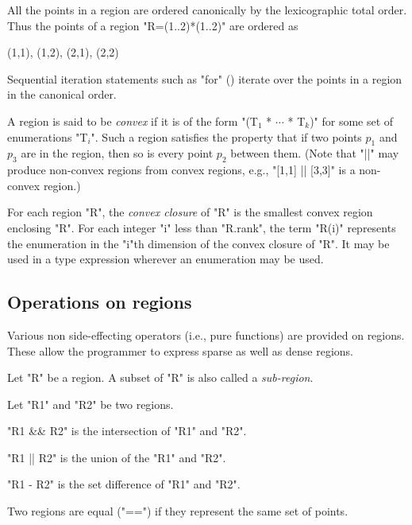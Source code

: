 All the points in a region are ordered canonically by the
lexicographic total order. Thus the points of a region \xcd"R=(1..2)*(1..2)"
are ordered as 
\begin{xten}
(1,1), (1,2), (2,1), (2,2)
\end{xten}
Sequential iteration statements such as \xcd"for" ()
iterate over the points in a region in the canonical order.

A region is said to be {\em convex} if it is of
the form \xcdmath"(T$_1$ * $\cdots$ * T$_k$)" for some set of enumerations
\xcdmath"T$_i$". Such a
region satisfies the property that if two points $p_1$ and $p_3$ are
in the region, then so is every point $p_2$ between them. (Note that
\xcd"||" may produce non-convex regions from convex regions, e.g.,
\xcd"[1,1] || [3,3]" is a non-convex region.)

For each region \xcd"R", the {\em convex closure} of \xcd"R" is the
smallest convex region enclosing \xcd"R".  For each integer \xcd"i"
less than \xcd"R.rank", the term \xcd"R(i)" represents the enumeration
in the \xcd"i"th dimension of the convex closure of \xcd"R". It may be
used in a type expression wherever an enumeration may be used.

\subsection{Operations on regions}
Various non side-effecting operators (i.e., pure functions) are
provided on regions. These allow the programmer to express sparse as
well as dense regions.

Let \xcd"R" be a region. A subset of \xcd"R" is also called a
{\em sub-region}.

Let \xcd"R1" and \xcd"R2" be two regions.

\xcd"R1 && R2" is the intersection of \xcd"R1" and \xcd"R2".

\xcd"R1 || R2" is the union of the \xcd"R1" and \xcd"R2".

\xcd"R1 - R2" is the set difference of \xcd"R1" and \xcd"R2".

Two regions are equal (\xcd"==") if they represent the same set of
points.


